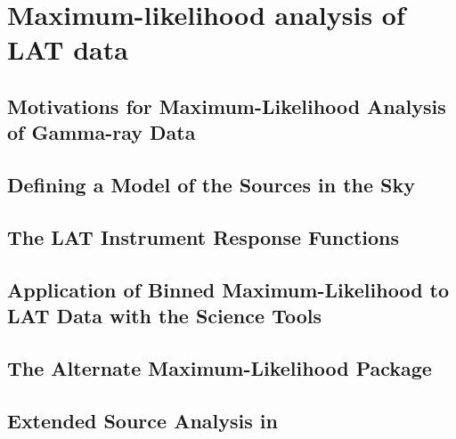 \chapter{Maximum-likelihood analysis of LAT data}



\section{Motivations for Maximum-Likelihood Analysis of Gamma-ray Data}


\section{Defining a Model of the Sources in the Sky}


\section{The LAT Instrument Response Functions}


\section{Application of Binned Maximum-Likelihood to LAT Data with the Science Tools}



\section{The Alternate Maximum-Likelihood Package \pointlike}


\section{Extended Source Analysis in \pointlike}
